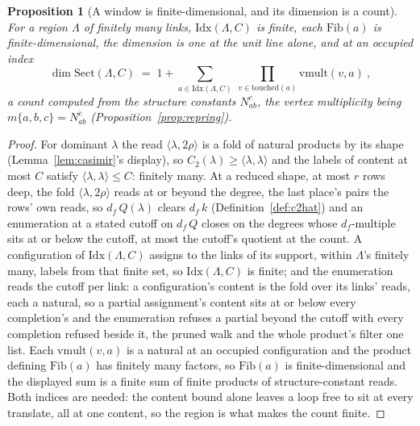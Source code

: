 \documentclass[11pt]{article}
\newtheorem{proposition}{Proposition}
\theoremstyle{definition}
\begin{document}
\begin{proposition}[A window is finite-dimensional, and its dimension is a
count]\label{prop:windowfinite}
For a region $\Lambda$ of finitely many links,
$\mathrm{Idx}(\Lambda,C)$ is finite, each $\mathrm{Fib}(a)$ is
finite-dimensional, the dimension is one at the unit line alone,
and at an occupied index
\[
\dim\mathrm{Sect}(\Lambda,C)\;=\;1+\sum_{a\in\mathrm{Idx}(\Lambda,C)}
\ \prod_{v\in\mathrm{touched}(a)}\mathrm{vmult}(v,a)\ ,
\]
\emph{a count computed from the structure constants $N^c_{ab}$}, the vertex
multiplicity being $m\{a,b,c\}=N^{\bar c}_{ab}$ (Proposition~\ref{prop:repring}).
\end{proposition}
\begin{proof}
For dominant $\lambda$ the read $\langle\lambda,2\rho\rangle$ is a fold
of natural products by its shape (Lemma~\ref{lem:casimir}'s display), so
$C_2(\lambda)\ge\langle\lambda,\lambda\rangle$ and the labels of content at most
$C$ satisfy $\langle\lambda,\lambda\rangle\le C$: finitely many. At a
reduced shape, at most $r$ rows deep, the fold
$\langle\lambda,2\rho\rangle$ reads at or beyond the degree, the last
place's pairs the rows' own reads, so $d_f\,Q(\lambda)$ clears
$d_f\,k$ (Definition~\ref{def:c2hat}) and an enumeration at a stated
cutoff on $d_f\,Q$ closes on the degrees whose $d_f$-multiple sits
at or below the cutoff, at most the cutoff's quotient at the count. A
configuration of $\mathrm{Idx}(\Lambda,C)$ assigns to the links of its
support, within $\Lambda$'s finitely many, labels from that finite
set, so
$\mathrm{Idx}(\Lambda,C)$ is finite; and the enumeration reads the
cutoff per link: a configuration's content is the fold over its
links' reads, each a natural, so a partial assignment's content
sits at or below every completion's and the enumeration refuses a
partial beyond the cutoff with every completion refused beside it,
the pruned walk and the whole product's filter one list. Each $\mathrm{vmult}(v,a)$ is a
natural at an occupied configuration
and the product defining $\mathrm{Fib}(a)$ has finitely many factors, so
$\mathrm{Fib}(a)$ is finite-dimensional and the displayed sum is a finite sum of
finite products of structure-constant reads. Both indices are needed: the
content bound alone leaves a loop free to sit at every translate, all at one
content, so the region is what makes the count finite.
\end{proof}
\end{document}
